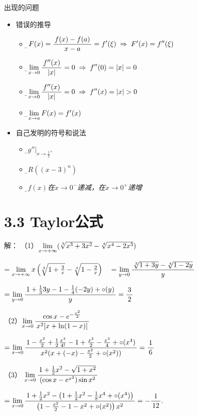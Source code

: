 \begin{frame}{出现的问题}
	\linespread{1.5}
	  \begin{itemize}%
	    \item 错误的推导
	    \begin{itemize}
	      \item \it\b $F(x)=\displaystyle\frac{\,{f(x)-f(a)}\,}{\,{x-a}\,}=f'(\xi)\;\Rightarrow\;
	      F'(x)=f''(\xi)$
	      \item \it\b $\lim\limits_{x\to{0}}\displaystyle\frac{\,{f''(x)}\,}{\,{|x|}\,}=0\;\Rightarrow\; f''(0)=|x|=0$
	      \item \it\b $\limx0\df{f''(x)}{|x|}=0\;\Rightarrow\; f''(x)=|x|>0$
	      \item \it\b $\lim\limits_{x\to{a}}F(x)=f'(x)$\pause
	    \end{itemize}
	    \item 自己发明的符号和说法
	    \begin{itemize}
	      \item \it\b $g''|_{x\to\frac12^+}$
	      \item \it\b $R((x-3)^n)$
	      \item \it\b $f(x)$在$x\to0^-$递减，在$x\to0^+$递增
	    \end{itemize}
	  \end{itemize}
\end{frame}

\section{3.3 Taylor公式}

\begin{frame}
	\linespread{1.5}
	\pause
	
	
	\small 解：
	（1）$\lim\limits_{x\to{+\infty}}(\sqrt[3]{x^3+3x^2}-\sqrt[4]{x^4-2x^3})$
	
	\quad$=\lim\limits_{x\to{+\infty}}x\left(\sqrt[3]{1+\frac3x}
	-\sqrt[4]{1-\frac2x}\right)
	\quad =\lim\limits_{y\to0}\displaystyle\frac{\,{\sqrt[3]{1+3y}
	-\sqrt[4]{1-2y}}\,}{\,{y}\,}$
	
	\quad$=\lim\limits_{y\to0}\displaystyle\frac{\,{1+\frac133y-1-\frac14(-2y)+\circ(y)}\,}{\,{y}\,}=\displaystyle\frac{\,{3}\,}{\,{2}\,}$
	
	\pause	
	（2）$\lim\limits_{x\to{0}}\displaystyle\frac{\,{\cos x-e^{-\frac{x^2}2}}\,}{\,{x^2[x+\ln(1-x)]}\,}$
	
	\quad$=\lim\limits_{x\to{0}}\displaystyle\frac{\,{1-\frac{x^2}2+\frac12\frac{x^4}{4!}-1+\frac{x^2}2
	-\frac{x^4}{4}+\circ(x^4)}\,}{\,{x^2(x+(-x)-\frac{x^2}2+\circ(x^2))}\,}
	=\displaystyle\frac{\,{1}\,}{\,{6}\,}$
	
	\pause
	（3）
	$\lim\limits_{x\to{0}}\displaystyle\frac{\,{1+\frac12x^2-\sqrt{1+x^2}}\,}{\,{(\cos x-e^{x^2})\sin x^2}\,}$
	
	\quad$=\lim\limits_{x\to{0}}\displaystyle\frac{\,{1+\frac12x^2-\left(1+\frac12x^2-\frac18x^4+\circ(x^4)\right)}\,}{\,{\left(1-\frac{x^2}2-1-x^2+\circ(x^2)\right)x^2}\,}=-\displaystyle\frac{\,{1}\,}{\,{12}\,}.$
\end{frame}

